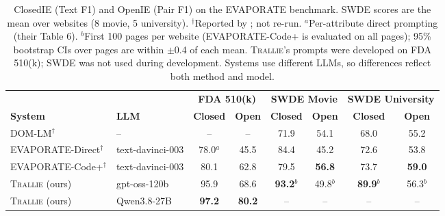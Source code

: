 
\begin{table}[t]
  \centering
  \small
  \setlength{\tabcolsep}{5pt}
  \begin{tabular}{l l c c c c c c}
    \hline
     & & \multicolumn{2}{c}{\textbf{FDA 510(k)}} & \multicolumn{2}{c}{\textbf{SWDE Movie}} & \multicolumn{2}{c}{\textbf{SWDE University}} \\
    \textbf{System} & \textbf{LLM} & \textbf{Closed} & \textbf{Open} & \textbf{Closed} & \textbf{Open} & \textbf{Closed} & \textbf{Open} \\
    \hline
    DOM-LM$^{\dagger}$ & -- & -- & -- & 71.9 & 54.1 & 68.0 & 55.2 \\
    EVAPORATE-Direct$^{\dagger}$ & text-davinci-003 & 78.0$^{a}$ & 45.5 & 84.4 & 45.2 & 72.6 & 53.8 \\
    EVAPORATE-Code+$^{\dagger}$ & text-davinci-003 & 80.1 & 62.8 & 79.5 & \textbf{56.8} & 73.7 & \textbf{59.0} \\
    \hline
    \textsc{Trallie} (ours) & gpt-oss-120b & 95.9 & 68.6 & \textbf{93.2}$^{b}$ & 49.8$^{b}$ & \textbf{89.9}$^{b}$ & 56.3$^{b}$ \\
    \textsc{Trallie} (ours) & Qwen3.8-27B & \textbf{97.2} & \textbf{80.2} & -- & -- & -- & -- \\
    \hline
  \end{tabular}
  \caption{ClosedIE (Text F1) and OpenIE (Pair F1) on the EVAPORATE benchmark. SWDE scores are the mean over websites (8 movie, 5 university).
    $^{\dagger}$Reported by \citet{arora2023evaporate}; not re-run.
    $^{a}$Per-attribute direct prompting (their Table 6).
    $^{b}$First 100 pages per website (EVAPORATE-Code+ is evaluated on all pages); 95\% bootstrap CIs over pages are within $\pm$0.4 of each mean.
    \textsc{Trallie}'s prompts were developed on FDA 510(k); SWDE was not used during development.
    Systems use different LLMs, so differences reflect both method and model.}
  \label{tab:main-results}
\end{table}

